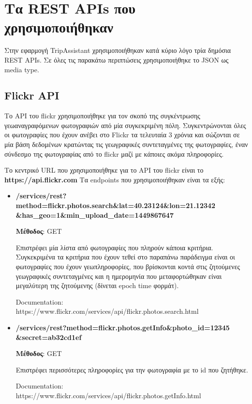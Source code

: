 \documentclass[oneside, 12pt]{book}
\begin{document}
\section{Τα REST APIs που χρησιμοποιήθηκαν}
Στην εφαρμογή TripAssistant χρησιμοποιήθηκαν κατά κύριο λόγο τρία 
δημόσια REST APIs.
Σε όλες τις παρακάτω περιπτώσεις χρησιμοποιήθηκε το JSON ως media type.

\subsection{Flickr API}
Το API του flickr χρησιμοποιήθηκε για τον σκοπό της συγκέντρωσης 
γεωαναγραφόμενων φωτογραφιών από μία συγκεκριμένη πόλη.
Συγκεντρώνονται όλες οι φωτογραφίες που έχουν ανέβει στο Flickr τα 
τελευταία 3 χρόνια και σώζονται σε μία βάση δεδομένων κρατώντας τις 
γεωγραφικές συντεταγμένες της φωτογραφίες, έναν σύνδεσμο της 
φωτογραφίας από το flickr μαζί με κάποιες ακόμα πληροφορίες.

Το κεντρικό URL που χρησιμοποιήθηκε για το 
API του flickr είναι το \textbf{https://api.flickr.com} 
Τα endpoints που χρησιμοποιήθηκαν είναι τα εξής:
\begin{itemize}
    \item \textbf{/services/rest?method=flickr.photos.search\&lat=40.23124\&lon=21.12342\\\&has\_geo=1\&min\_upload\_date=1449867647}
    
    \textbf{Μέθοδος}: GET
    
    Επιστρέφει μία λίστα από φωτογραφίες που πληρούν κάποια κριτήρια.
    Συγκεκριμένα τα κριτήρια που έχουν τεθεί στο παραπάνω παράδειγμα 
    είναι οι φωτογραφίες που έχουν γεωπληροφορίες, που βρίσκονται 
    κοντά στις ζητούμενες γεωγραφικές συντεταγμένες και η ημερομηνία 
    που μεταφορτώθηκαν είναι μεγαλύτερη της ζητούμενης (δίνεται epoch time φορμάτ).
    
    Documentation: https://www.flickr.com/services/api/flickr.photos.search.html
    \item \textbf{/services/rest?method=flickr.photos.getInfo\&photo\_id=12345\\\&secret=ab32cd1ef}
    
    \textbf{Μέθοδος}: GET
    
    Επιστρέφει περισσότερες πληροφορίες για την φωτογραφία με 
    το id που ζητήθηκε.
    
    Documentation: https://www.flickr.com/services/api/flickr.photos.getInfo.html
\end{itemize}
\end{document}
